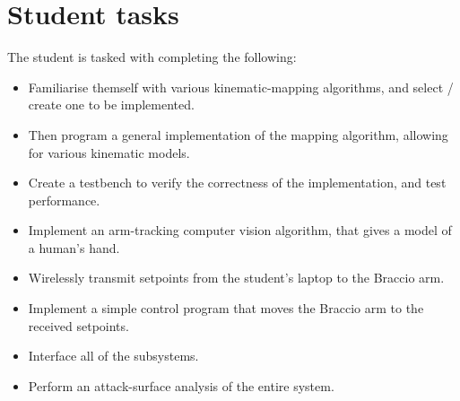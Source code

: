 \section{Student tasks}
\label{sec:student_tasks}
The student is tasked with completing the following:
\begin{itemize}
    \item Familiarise themself with various kinematic-mapping algorithms, and select / create one to be implemented.
    \item Then program a general implementation of the mapping algorithm, allowing for various kinematic models.
    \item Create a testbench to verify the correctness of the implementation, and test performance.
    \item Implement an arm-tracking computer vision algorithm, that gives a model of a human's hand.
    \item Wirelessly transmit setpoints from the student's laptop to the Braccio arm.
    \item Implement a simple control program that moves the Braccio arm to the received setpoints.
    \item Interface all of the subsystems.
    \item Perform an attack-surface analysis of the entire system.
\end{itemize}
